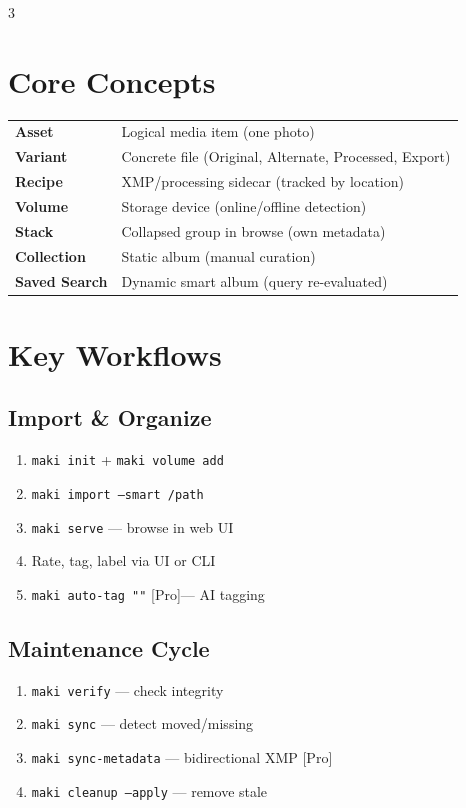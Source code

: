 \documentclass[a4paper,landscape,8pt]{article}
\newcommand{\cmd}[1]{\texttt{\footnotesize #1}}
\newcommand{\pro}{\textcolor{maki-teal}{\scriptsize [Pro]}}
\begin{document}
\renewcommand{\arraystretch}{1.2}
\begin{multicols}{3}

\section{Core Concepts}
\begin{tabularx}{\columnwidth}{@{}lX@{}}
\textbf{Asset} & Logical media item (one photo) \\
\textbf{Variant} & Concrete file (Original, Alternate, Processed, Export) \\
\textbf{Recipe} & XMP/processing sidecar (tracked by location) \\
\textbf{Volume} & Storage device (online/offline detection) \\
\textbf{Stack} & Collapsed group in browse (own metadata) \\
\textbf{Collection} & Static album (manual curation) \\
\textbf{Saved Search} & Dynamic smart album (query re-evaluated) \\
\end{tabularx}

\section{Key Workflows}

\subsection{Import \& Organize}
\begin{enumerate}[leftmargin=1.5em]
\item \cmd{maki init} + \cmd{maki volume add}
\item \cmd{maki import --smart /path}
\item \cmd{maki serve} — browse in web UI
\item Rate, tag, label via UI or CLI
\item \cmd{maki auto-tag ""} \pro — AI tagging
\end{enumerate}

\subsection{Maintenance Cycle}
\begin{enumerate}[leftmargin=1.5em]
\item \cmd{maki verify} — check integrity
\item \cmd{maki sync} — detect moved/missing
\item \cmd{maki sync-metadata} — bidirectional XMP \pro
\item \cmd{maki cleanup --apply} — remove stale
\end{enumerate}


\end{multicols}
\end{document}
